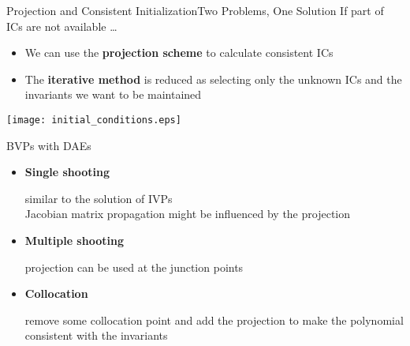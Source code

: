 \begin{frame}{Projection and Consistent Initialization}{Two Problems, One Solution}
  If part of ICs are not available \dots
  \begin{itemize}
    \item We can use the \textbf{projection scheme} to calculate consistent ICs
    \item The \textbf{iterative method} is reduced as selecting only the unknown ICs and the invariants we want to be maintained
  \end{itemize}
  \centering\texttt{[image: initial\_conditions.eps]}
\end{frame}

\begin{frame}{BVPs with DAEs}
  \begin{itemize}
    \item \textbf{Single shooting} \\
    \begin{small}
      \qquad similar to the solution of IVPs\\
      \qquad Jacobian matrix propagation might be influenced by the projection
    \end{small}
    \item \textbf{Multiple shooting} \\
    \begin{small}
      \qquad projection can be used at the junction points
    \end{small}
    \item \textbf{Collocation} \\
    \begin{small}
      \qquad remove some collocation point and add the projection to make the polynomial consistent with the invariants
    \end{small}
  \end{itemize}
\end{frame}

